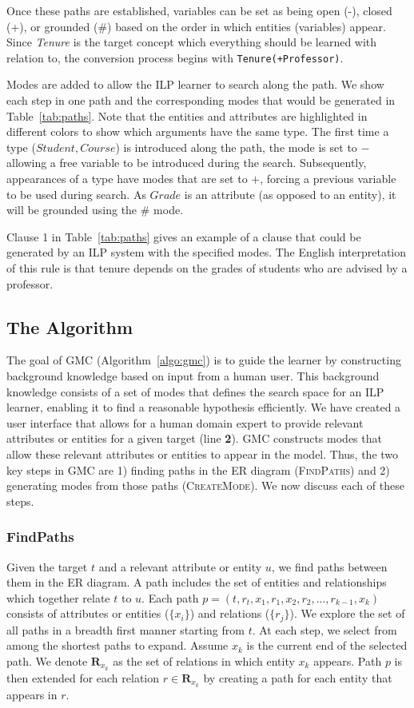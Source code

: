 \documentclass[sigconf]{acmart}
\begin{document}
Once these paths are established, variables can be set as being open (-), closed (+), or grounded (\#) based on the order in which entities (variables) appear. Since \textit{Tenure} is the target concept which everything should be learned with relation to, the conversion process begins with \texttt{Tenure(+Professor)}.

Modes are added to allow the ILP learner to search along the path. We show each step in one path and the corresponding modes that would be generated in Table~\ref{tab:paths}. Note that the entities and attributes are highlighted in different colors to show which arguments have the same type. The first time a type ($Student, Course$) is introduced along the path, the mode is set to $-$ allowing a free variable to be introduced during the search. Subsequently, appearances of a type have modes that are set to $+$, forcing a previous variable to be used during search. As $Grade$ is an attribute (as opposed to an entity), it will be grounded using the $\#$ mode.

Clause 1 in Table~\ref{tab:paths} gives an example of a clause that could be generated by an ILP system with the specified modes. The English interpretation of this rule is that tenure depends on the grades of students who are advised by a professor.

\subsection{The Algorithm}

The goal of \textsc{GMC} (Algorithm~\ref{algo:gmc}) is to guide the learner by constructing background knowledge based on input from a human user. This background knowledge consists of a set of modes that defines the search space for an ILP learner, enabling it to find a reasonable hypothesis efficiently. We have created a user interface that allows for a human domain expert to provide relevant attributes or entities for a given target (line \textbf{2}). \textsc{GMC} constructs modes that allow these relevant attributes or entities to appear in the model. Thus, the two key steps in \textsc{GMC} are 1) finding paths in the ER diagram (\textsc{FindPaths}) and 2) generating modes from those paths (\textsc{CreateMode}). We now discuss each of these steps.

\subsubsection{FindPaths}
Given the target $t$ and a relevant attribute or entity $u$, we find paths between them in the ER diagram. A path includes the set of entities and relationships which together relate $t$ to $u$. Each path $p=(t,r_t,x_1,r_1,x_2,r_2,...,r_{k-1},x_k)$ consists of attributes or entities ($\{x_i\}$) and relations ($\{r_j\}$). We explore the set of all paths in a breadth first manner starting from $t$. At each step, we select from among the shortest paths to expand. Assume $x_k$ is the current end of the selected path. We denote $\mathbf{R}_{x_k}$ as the set of relations in which entity $x_k$ appears. Path $p$ is then extended for each relation $r\in \mathbf{R}_{x_k}$ by creating a path for each entity that appears in $r$.
\end{document}
